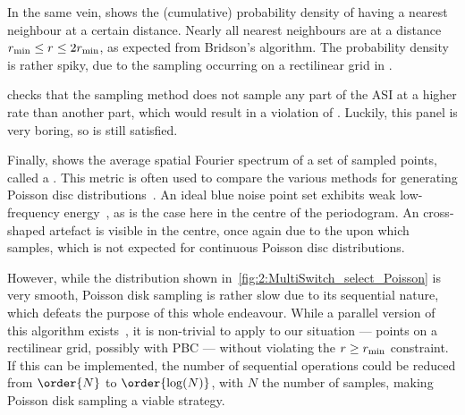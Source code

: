 In the same vein,  shows the (cumulative) probability density of having a nearest neighbour at a certain distance.
Nearly all nearest neighbours are at a distance $r_\mathrm{min} \leq r \leq 2r_\mathrm{min}$, as expected from Bridson's algorithm.
The probability density is rather spiky, due to the sampling occurring on a rectilinear grid in \hotspice. \par
{} checks that the sampling method does not sample any part of the ASI at a higher rate than another part, which would result in a violation of .
Luckily, this panel is very boring, so  is still satisfied. \par
Finally,  shows the average spatial Fourier spectrum of a set of sampled points, called a .
This metric is often used to compare the various methods for generating Poisson disc distributions~\cite{PoissonDiskComparison}.
An ideal blue noise point set exhibits weak low-frequency energy~\cite{EfficientBlueNoisePointSets}, as is the case here in the centre of the periodogram.
An cross-shaped artefact is visible in the centre, once again due to the  upon which \hotspice samples, which is not expected for continuous Poisson disc distributions. \\\par

However, while the distribution shown in~\cref{fig:2:MultiSwitch_select_Poisson} is very smooth, Poisson disk sampling is rather slow due to its sequential nature, which defeats the purpose of this whole  endeavour.
While a parallel version of this algorithm exists~\cite{PoissonDiskParallel}, it is non-trivial to apply to our situation --- points on a rectilinear grid, possibly with PBC --- without violating the $r \geq r_\mathrm{min}$ constraint. %
If this can be implemented, the number of sequential operations could be reduced from $\order{N}$ to $\order{\log(N)}$, with $N$ the number of samples, making Poisson disk sampling a viable strategy.

